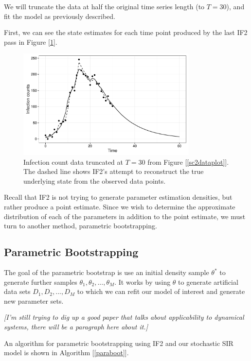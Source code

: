 	We will truncate the data at half the original time series length (to $T = 30$), and fit the model as previously described.

	First, we can see the state estimates for each time point produced by the last IF2 pass in Figure [\ref{if2fit}].

	\begin{figure}
        \centering
        \captionsetup{width=.8\linewidth}
        \includegraphics[width=0.8\textwidth]{./images/if2fit.pdf}
        \caption{Infection count data truncated at $T = 30$ from Figure [\ref{sc2dataplot}]. The dashed line shows IF2's attempt to reconstruct the true underlying state from the observed data points. \label{if2fit}}
    \end{figure}

    Recall that IF2 is not trying to generate parameter estimation densities, but rather produce a point estimate. Since we wish to determine the approximate distribution of each of the parameters in addition to the point estimate, we must turn to another method, parametric bootstrapping.


\subsection{Parametric Bootstrapping}

	The goal of the parametric bootstrap is use an initial density sample $\theta^*$ to generate further samples $\theta_1, \theta_2, ..., \theta_M$. It works by using $\theta$ to generate artificial data sets $D_1, D_2, ..., D_M$ to which we can refit our model of interest and generate new parameter sets.

	\textit{[I'm still trying to dig up a good paper that talks about applicability to dynamical systems, there will be a paragraph here about it.]}

	An algorithm for parametric bootstrapping using IF2 and our stochastic SIR model is shown in Algorithm [\ref{paraboot}].

